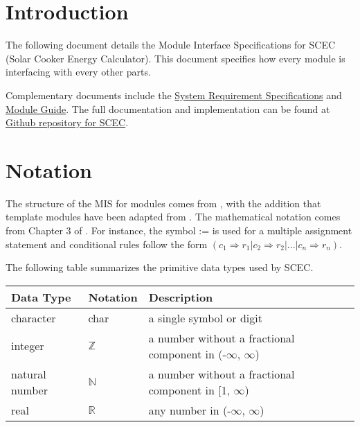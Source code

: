 \documentclass[12pt, titlepage]{article}
\begin{document}
\newpage

\tableofcontents

\listoftables

\newpage


\section{Introduction}

The following document details the Module Interface Specifications for
SCEC (Solar Cooker Energy Calculator). This document specifies how every module is interfacing with every other parts. 

Complementary documents include the \href{https://github.com/DeeshaPatel/CAS-741-Solar-Cooker/blob/2a6c0175891c01960d83cb99b73a762a9b2d2508/docs/SRS/SRS.pdf}{System Requirement Specifications}
and \href{https://github.com/DeeshaPatel/CAS-741-Solar-Cooker/blob/c7cc1be3611cae9110b84940b64ef40c7d29aa02/docs/Design/SoftArchitecture/MG.pdf}{Module Guide}.  The full documentation and implementation can be
found at \href{https://github.com/DeeshaPatel/CAS-741-Solar-Cooker.git}{Github repository for SCEC}.

\section{Notation}


The structure of the MIS for modules comes from \citet{HoffmanAndStrooper1995},
with the addition that template modules have been adapted from
\cite{GhezziEtAl2003}.  The mathematical notation comes from Chapter 3 of
\citet{HoffmanAndStrooper1995}.  For instance, the symbol := is used for a
multiple assignment statement and conditional rules follow the form $(c_1
\Rightarrow r_1 | c_2 \Rightarrow r_2 | ... | c_n \Rightarrow r_n )$.

The following table summarizes the primitive data types used by SCEC. 

\begin{center}
\renewcommand{\arraystretch}{1.2}
\noindent 
\begin{tabular}{l l p{7.5cm}} 
\toprule 
\textbf{Data Type} & \textbf{Notation} & \textbf{Description}\\ 
\midrule
character & char & a single symbol or digit\\
integer & $\mathbb{Z}$ & a number without a fractional component in (-$\infty$, $\infty$) \\
natural number & $\mathbb{N}$ & a number without a fractional component in [1, $\infty$) \\
real & $\mathbb{R}$ & any number in (-$\infty$, $\infty$)\\
\bottomrule
\end{tabular} 
\end{center}
\end{document}
